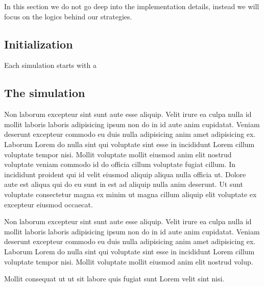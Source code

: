 \documentclass[12pt]{article}
\begin{document}
In this section we do not go deep into the implementation details, instead we will focus on the logics behind our strategies.

\subsection{Initialization}

Each simulation starts with a

\subsection{The simulation}



Non laborum excepteur sint sunt aute esse aliquip. Velit irure ea culpa nulla id mollit laboris laboris adipisicing ipsum non do in id aute anim cupidatat. Veniam deserunt excepteur commodo eu duis nulla adipisicing anim amet adipisicing ex. Laborum Lorem do nulla sint qui voluptate sint esse in incididunt Lorem cillum voluptate tempor nisi. Mollit voluptate mollit eiusmod anim elit nostrud voluptate veniam commodo id do officia cillum voluptate fugiat cillum. In incididunt proident qui id velit eiusmod aliquip aliqua nulla officia ut. Dolore aute est aliqua qui do eu sunt in est ad aliquip nulla anim deserunt. Ut sunt voluptate consectetur magna ex minim ut magna cillum aliquip elit voluptate ex excepteur eiusmod occaecat.


\pagestyle{empty}
\begin{figure}
	\centering
	\begin{minipage}{.5\textwidth}
	  \scalebox{.8}{}
	\end{minipage}%
	\begin{minipage}{.5\textwidth}
	  \scalebox{.8}{}
	\end{minipage}
\end{figure}

Non laborum excepteur sint sunt aute esse aliquip. Velit irure ea culpa nulla id mollit laboris laboris adipisicing ipsum non do in id aute anim cupidatat. Veniam deserunt excepteur commodo eu duis nulla adipisicing anim amet adipisicing ex. Laborum Lorem do nulla sint qui voluptate sint esse in incididunt Lorem cillum voluptate tempor nisi. Mollit voluptate mollit eiusmod anim elit nostrud volup.



Mollit consequat ut ut sit labore quis fugiat sunt Lorem velit sint nisi.
\end{document}
